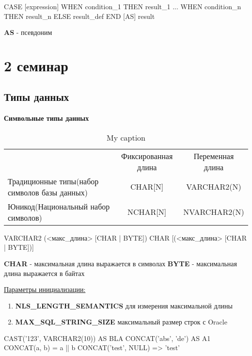 \documentclass[a5paper,10pt]{article}
\begin{document}
				\begin{lstlistening}
					CASE [expression]
						WHEN condition\_1 THEN result\_1
						...
						WHEN condition\_n THEN result\_n
						ELSE result\_def
					END [AS] result
				\begin{lstlistening}
				\textbf{AS} - псевдоним

	\section{2 семинар}
		\subsection{Типы данных}
			\paragraph{Символьные типы данных}
				\begin{table}[]
					\centering
					\caption{My caption}
					\label{my-label}
					\begin{tabular}{lcc}
					 & Фиксированная длина & Переменная длина \\
					 Традиционные типы(набор символов базы данных) & CHAR[{N}] & VARCHAR2(N) \\
					 Юникод(Национальный набор символов) & NCHAR[{N}] & NVARCHAR2(N) \\
					\end{tabular}
				\end{table}

				\begin{lstlistening}
					VARCHAR2 (<макс\_длина> [CHAR | BYTE])
					CHAR [(<макс\_длина> [CHAR | BYTE])]
				\begin{lstlistening}

				\textbf{CHAR} - максимальная длина выражается в символах
				\textbf{BYTE} - максимальная длина выражается в байтах

				\underline{Параметры инициализации:}
				\begin{enumerate}
					\item \textbf{NLS\_LENGTH\_SEMANTICS} для измерения максимальной длины
					\item \textbf{MAX\_SQL\_STRING\_SIZE} максимальный размер строк с Oracle
				\end{enumerate}

				CAST('123', VARCHAR2(10)) AS BLA
				CONCAT('abs', 'de') AS A1
				CONCAT(a, b) = a || b
				CONCAT('test', NULL) => 'test'


\end{lstlistening}
\end{lstlistening}
\end{lstlistening}
\end{lstlistening}
\end{document}
